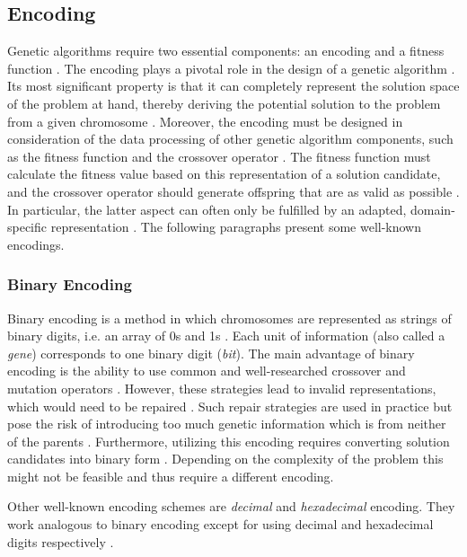 \documentclass[sigconf]{acmart}
\begin{document}
\subsection{Encoding}
Genetic algorithms require two essential components: an encoding and
a fitness function \cite{Affenzeller2009}.
The encoding plays a pivotal role in the design of a genetic algorithm
\cite{Katoch2021}.
Its most significant property is that it can completely represent the solution
space of the problem at hand, thereby deriving the potential solution to the
problem from a given chromosome \cite{Affenzeller2009}.
Moreover, the encoding must be designed in consideration of the data
processing of other genetic algorithm components, such as the fitness function
and the crossover operator \cite{Affenzeller2009}.
The fitness function must calculate the fitness value based on this
representation of a solution candidate, and the crossover operator should
generate offspring that are as valid as possible \cite{Affenzeller2009}.
In particular, the latter aspect can often only be fulfilled by an adapted,
domain-specific representation \cite{Affenzeller2009}.
%
The following paragraphs present some well-known encodings.

\subsubsection{Binary Encoding}
Binary encoding is a method in which chromosomes are represented as strings
of binary digits, i.e. an array of 0s and 1s \cite{Katoch2021}.
Each unit of information (also called a \textit{gene}) corresponds to one binary
digit (\textit{bit}).
%
The main advantage of binary encoding is the ability to use common and
well-researched crossover and mutation operators \cite{Katoch2021}.
However, these strategies lead to invalid representations, which
would need to be repaired \cite{Beligiannis2009}. Such repair strategies are
used in practice but pose the risk of introducing too much genetic information
which is from neither of the parents \cite{Affenzeller2009,Beligiannis2009}.
%
Furthermore, utilizing this encoding requires converting solution candidates
into binary form \cite{Katoch2021}. Depending on the complexity of the problem
this might not be feasible and thus require a different encoding.

Other well-known encoding schemes are \textit{decimal} and \textit{hexadecimal}
encoding. They work analogous to binary encoding except for using decimal and
hexadecimal digits respectively \cite{Katoch2021}.
\end{document}
